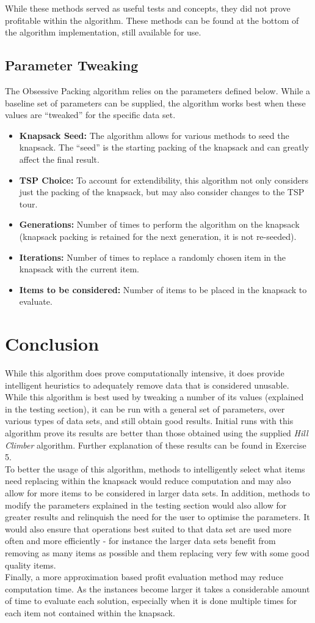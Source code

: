 \documentclass[a4paper,12pt]{article}
\begin{document}
While these methods served as useful tests and concepts, they did not prove profitable within the algorithm. These methods can be found at the bottom of the algorithm implementation, still available for use.

\newpage
\subsection{Parameter Tweaking}
The Obsessive Packing algorithm relies on the parameters defined below. While a baseline set of parameters can be supplied, the algorithm works best when these values are ``tweaked'' for the specific data set.
\begin{itemize}
	\item {\bf Knapsack Seed:} The algorithm allows for various methods to seed the knapsack. The ``seed'' is the starting packing of the knapsack and can greatly affect the final result.
	\item {\bf TSP Choice:} To account for extendibility, this algorithm not only considers just the packing of the knapsack, but may also consider changes to the TSP tour.
	\item {\bf Generations:} Number of times to perform the algorithm on the knapsack (knapsack packing is retained for the next generation, it is not re-seeded).
	\item {\bf Iterations:} Number of times to replace a randomly chosen item in the knapsack with the current item.
	\item {\bf Items to be considered:} Number of items to be placed in the knapsack to evaluate.
\end{itemize}

\section{Conclusion}
While this algorithm does prove computationally intensive, it does provide intelligent heuristics to adequately remove data that is considered unusable. While this algorithm is best used by tweaking a number of its values (explained in the testing section), it can be run with a general set of parameters, over various types of data sets, and still obtain good results. Initial runs with this algorithm prove its results are better than those obtained using the supplied \textit{Hill Climber} algorithm. Further explanation of these results can be found in Exercise 5.\\

To better the usage of this algorithm, methods to intelligently select what items need replacing within the knapsack would reduce computation and may also allow for more items to be considered in larger data sets. In addition, methods to modify the parameters explained in the testing section would also allow for greater results and relinquish the need for the user to optimise the parameters. It would also ensure that operations best suited to that data set are used more often and more efficiently - for instance the larger data sets benefit from removing as many items as possible and them replacing very few with some good quality items.\\

Finally, a more approximation based profit evaluation method may reduce computation time. As the instances become larger it takes a considerable amount of time to evaluate each solution, especially when it is done multiple times for each item not contained within the knapsack.
\end{document}
